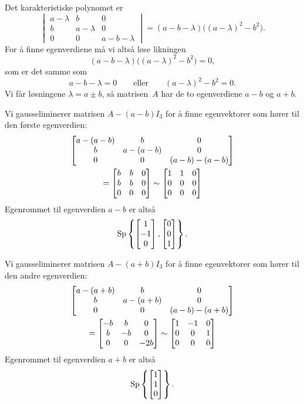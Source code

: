 \begin{losning}
Det karakteristiske polynomet er
\[
\begin{vmatrix}
a - \lambda & b           & 0               \\
b           & a - \lambda & 0               \\
0           & 0           & a - b - \lambda
\end{vmatrix}
= (a - b - \lambda) \big( (a - \lambda)^2 - b^2 \big).
\]
For å finne egenverdiene må vi altså løse likningen
\[
(a - b - \lambda) \big( (a - \lambda)^2 - b^2 \big) = 0,
\]
som er det samme som
\[
a - b - \lambda = 0
\qquad\text{eller}\qquad
(a - \lambda)^2 - b^2 = 0.
\]
Vi får løsningene $\lambda = a \pm b$, så matrisen~$A$ har de to
egenverdiene $a - b$ og $a + b$.

Vi gausseliminerer matrisen $A - (a - b)I_3$ for å finne egenvektorer
som hører til den første egenverdien:
\begin{multline*}
\begin{bmatrix}
a - (a - b) & b           & 0                 \\
b           & a - (a - b) & 0                 \\
0           & 0           & (a - b) - (a - b)
\end{bmatrix}
\\
=
\begin{bmatrix}
b & b & 0 \\
b & b & 0 \\
0 & 0 & 0
\end{bmatrix}
\sim
\begin{bmatrix}
1 & 1 & 0 \\
0 & 0 & 0 \\
0 & 0 & 0
\end{bmatrix}
\end{multline*}
Egenrommet til egenverdien $a - b$ er altså
\[
\operatorname{Sp} \left\{ \begin{bmatrix} 1 \\ -1 \\ 0 \end{bmatrix}, \begin{bmatrix} 0 \\ 0 \\ 1 \end{bmatrix} \right\}.
\]

Vi gausseliminerer matrisen $A - (a + b)I_3$ for å finne egenvektorer
som hører til den andre egenverdien:
\begin{multline*}
\begin{bmatrix}
a - (a + b) & b           & 0                 \\
b           & a - (a + b) & 0                 \\
0           & 0           & (a - b) - (a + b)
\end{bmatrix}
\\
=
\begin{bmatrix}
-b &  b & 0   \\
 b & -b & 0   \\
 0 &  0 & -2b
\end{bmatrix}
\sim
\begin{bmatrix}
1 & -1 & 0 \\
0 &  0 & 1 \\
0 &  0 & 0
\end{bmatrix}
\end{multline*}
Egenrommet til egenverdien $a + b$ er altså
\[
\operatorname{Sp} \left\{ \begin{bmatrix} 1 \\ 1 \\ 0 \end{bmatrix} \right\}.
\]


\end{losning}
